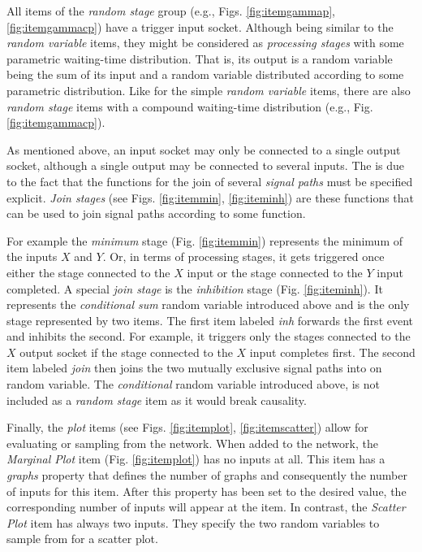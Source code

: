 All items of the \emph{random stage} group (e.g., Figs. \ref{fig:itemgammap}, \ref{fig:itemgammacp}) have a trigger input socket. Although being similar to the \emph{random variable} items, they might be considered as \emph{processing stages} with some parametric waiting-time distribution. That is, its output is a random variable being the sum of its input and a random variable distributed according to some parametric distribution. Like for the simple \emph{random variable} items, there are also \emph{random stage} items with a compound waiting-time distribution (e.g., Fig. \ref{fig:itemgammacp}).

As mentioned above, an input socket may only be connected to a single output socket, although a single output may be connected to several inputs. The is due to the fact that the functions for the join of several \emph{signal paths} must be specified explicit. \emph{Join stages} (see Figs. \ref{fig:itemmin}, \ref{fig:iteminh}) are these functions that can be used to join signal paths according to some function. 

For example the \emph{minimum} stage (Fig. \ref{fig:itemmin}) represents the minimum of the inputs $X$ and $Y$. Or, in terms of processing stages, it gets triggered once either the stage connected to the $X$ input or the stage connected to the $Y$ input completed. A special \emph{join stage} is the \emph{inhibition} stage (Fig. \ref{fig:iteminh}). It represents the \emph{conditional sum} random variable introduced above and is the only stage represented by two items. The first item labeled \emph{inh} forwards the first event and inhibits the second. For example, it triggers only the stages connected to the $X$ output socket if the stage connected to the $X$ input completes first. The second item labeled \emph{join} then joins the two mutually exclusive signal paths into on random variable. The \emph{conditional} random variable introduced above, is not included as a \emph{random stage} item as it would break causality.

Finally, the \emph{plot} items (see Figs. \ref{fig:itemplot}, \ref{fig:itemscatter}) allow for evaluating or sampling from the network. When added to the network, the \emph{Marginal Plot} item (Fig. \ref{fig:itemplot}) has no inputs at all. This item has a \emph{graphs} property that defines the number of graphs and consequently the number of inputs for this item. After this property has been set to the desired value, the corresponding number of inputs will appear at the item. In contrast, the \emph{Scatter Plot} item has always two inputs. They specify the two random variables to sample from for a scatter plot.

